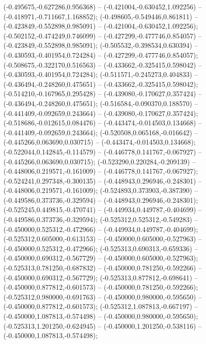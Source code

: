  (-0.495675,-0.627286,0.956368) -- (-0.421004,-0.630452,1.092256) -- (-0.418971,-0.711667,1.168852);
 (-0.498605,-0.549446,0.861811) -- (-0.423849,-0.552898,0.985091) -- (-0.421004,-0.630452,1.092256);
 (-0.502152,-0.474249,0.746099) -- (-0.427299,-0.477746,0.854057) -- (-0.423849,-0.552898,0.985091);
 (-0.505532,-0.398534,0.630394) -- (-0.430593,-0.401954,0.724284) -- (-0.427299,-0.477746,0.854057);
 (-0.508675,-0.322170,0.516563) -- (-0.433662,-0.325415,0.598042) -- (-0.430593,-0.401954,0.724284);
 (-0.511571,-0.245273,0.404833) -- (-0.436494,-0.248260,0.475651) -- (-0.433662,-0.325415,0.598042);
 (-0.514210,-0.167965,0.295428) -- (-0.439080,-0.170627,0.357424) -- (-0.436494,-0.248260,0.475651);
 (-0.516584,-0.090370,0.188570) -- (-0.441409,-0.092659,0.243664) -- (-0.439080,-0.170627,0.357424);
 (-0.518686,-0.012615,0.084476) -- (-0.443474,-0.014503,0.134668) -- (-0.441409,-0.092659,0.243664);
 (-0.520508,0.065168,-0.016642) -- (-0.445266,0.063690,0.030715) -- (-0.443474,-0.014503,0.134668);
 (-0.522044,0.142845,-0.114579) -- (-0.446778,0.141767,-0.067927) -- (-0.445266,0.063690,0.030715);
 (-0.523290,0.220284,-0.209139) -- (-0.448006,0.219571,-0.161009) -- (-0.446778,0.141767,-0.067927);
 (-0.524241,0.297348,-0.300135) -- (-0.448943,0.296946,-0.248301) -- (-0.448006,0.219571,-0.161009);
 (-0.524893,0.373903,-0.387390) -- (-0.449586,0.373736,-0.329594) -- (-0.448943,0.296946,-0.248301);
 (-0.525245,0.449815,-0.470741) -- (-0.449934,0.449787,-0.404699) -- (-0.449586,0.373736,-0.329594);
 (-0.525312,0.525312,-0.549283) -- (-0.450000,0.525312,-0.472966) -- (-0.449934,0.449787,-0.404699);
 (-0.525312,0.605000,-0.613153) -- (-0.450000,0.605000,-0.527963) -- (-0.450000,0.525312,-0.472966);
 (-0.525313,0.690313,-0.659336) -- (-0.450000,0.690312,-0.567729) -- (-0.450000,0.605000,-0.527963);
 (-0.525313,0.781250,-0.687832) -- (-0.450000,0.781250,-0.592266) -- (-0.450000,0.690312,-0.567729);
 (-0.525313,0.877812,-0.698641) -- (-0.450000,0.877812,-0.601573) -- (-0.450000,0.781250,-0.592266);
 (-0.525312,0.980000,-0.691763) -- (-0.450000,0.980000,-0.595650) -- (-0.450000,0.877812,-0.601573);
 (-0.525312,1.087813,-0.667197) -- (-0.450000,1.087813,-0.574498) -- (-0.450000,0.980000,-0.595650);
 (-0.525313,1.201250,-0.624945) -- (-0.450000,1.201250,-0.538116) -- (-0.450000,1.087813,-0.574498);
